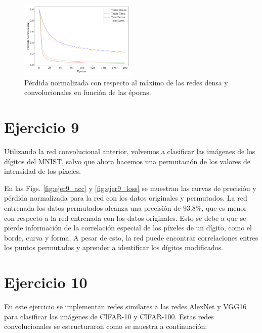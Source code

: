     \begin{figure}[H]
        \begin{small}
            \begin{center}
                \includegraphics[width=0.5\textwidth]{Graphs/ejer8_loss.pdf}
            \end{center}
            \caption{Pérdida normalizada con respecto al máximo de las redes densa y convolucionales en función de las épocas. }
            \label{fig:ejer8_loss}
        \end{small}
    \end{figure}


\section*{Ejercicio 9}

    Utilizando la red convolucional anterior, volvemos a clasificar las imágenes de los dígitos del MNIST, salvo que ahora hacemos una permutación de los valores de intensidad de los píxeles. 

    En las Figs. \ref{fig:ejer9_acc} y \ref{fig:ejer9_loss} se muestran las curvas de precisión y pérdida normalizada para la red con los datos originales y permutados. La red entrenada los datos permutados alcanza una precisión  de $93.8\%$, que es menor con respecto a la red entrenada con los datos originales. Esto se debe a que se pierde información de la correlación especial de los píxeles de un dígito, como el borde, curva y forma. A pesar de esto, la red puede encontrar correlaciones entres los puntos permutados  y aprender a identificar los dígitos modificados.



\section*{Ejercicio 10}

En este ejercicio se implementan redes similares a las redes AlexNet y VGG16 para clasificar las imágenes de CIFAR-10 y CIFAR-100. Estas redes convolucionales se estructuraron como se muestra a continuación:

